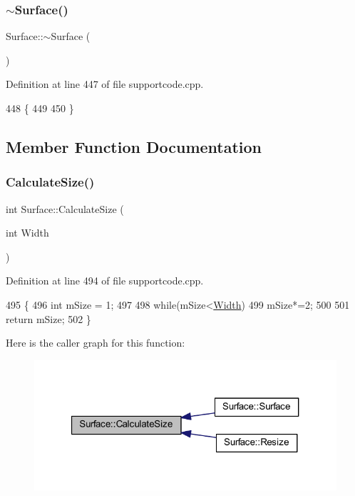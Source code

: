 \subsubsection{\texorpdfstring{$\sim$\+Surface()}{~Surface()}}
{\footnotesize\ttfamily Surface\+::$\sim$\+Surface (\begin{DoxyParamCaption}{ }\end{DoxyParamCaption})}



Definition at line 447 of file supportcode.\+cpp.


\begin{DoxyCode}
448 \{
449 
450 \}
\end{DoxyCode}


\subsection{Member Function Documentation}
\mbox{\label{class_surface_aeb8a8540f415a4d29c440667e8532e91}} 
\subsubsection{\texorpdfstring{Calculate\+Size()}{CalculateSize()}}
{\footnotesize\ttfamily int Surface\+::\+Calculate\+Size (\begin{DoxyParamCaption}\item[{int}]{Width }\end{DoxyParamCaption})}



Definition at line 494 of file supportcode.\+cpp.


\begin{DoxyCode}
495 \{
496     \textcolor{keywordtype}{int} mSize = 1;
497 
498     \textcolor{keywordflow}{while}(mSize<\hyperlink{class_surface_ae76d7c2fa208df6979a77cc60e8105c0}{Width})
499         mSize*=2;
500 
501     \textcolor{keywordflow}{return} mSize;
502 \}
\end{DoxyCode}
Here is the caller graph for this function\+:
\nopagebreak
\begin{figure}[H]
\begin{center}
\leavevmode
\includegraphics[width=321pt]{class_surface_aeb8a8540f415a4d29c440667e8532e91_icgraph}
\end{center}
\end{figure}
\mbox{\label{class_surface_a8f8da8f3ee82b8e657916f40b3f40eff}} 
